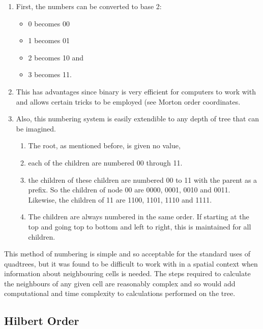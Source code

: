 \begin{enumerate}
	\item First, the numbers can be converted to base 2:
	\begin{itemize}
		\item 0 becomes 00
		\item 1 becomes 01
		\item 2 becomes 10 and
		\item 3 becomes 11.
	\end{itemize}

	\item This has advantages since binary is very efficient for computers to
	work with and allows certain tricks to be employed (see Morton order
	coordinates.

	\item Also, this numbering system is easily extendible to any depth of
	tree that can be imagined.

	\begin{enumerate}
		\item The root, as mentioned before, is given no value,
		\item each of the children are numbered {00} through 11.

		\item the children of these children are numbered 00 to 11 with the
		parent as a prefix. So the children of node 00 are 0000, 0001, 0010
		and 0011. Likewise, the children of 11 are 1100, 1101, 1110 and 1111.

		\item The children are always numbered in the same order. If starting
		at the top and going top to bottom and left to right, this is
		maintained for all children.
	\end{enumerate}
\end{enumerate}

This method of numbering is simple and so acceptable for the standard uses of
quadtrees, but it was found to be difficult to work with in a spatial context
when information about neighbouring cells is needed. The steps required to
calculate the neighbours of any given cell are reasonably complex and so would
add computational and time complexity to calculations performed on the tree.

\subsection{Hilbert Order}
\label{sub:hilbert_order}

